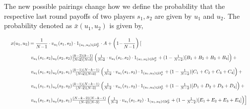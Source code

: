 \documentclass[11pt]{article}
\theoremstyle{plainCl1}
\theoremstyle{plainCl2}
\begin{document}
The new possible pairings change how we define the probability that the
respective last round payoffs of two players \(s_1, s_2\) are given by \(u_1\)
and \(u_2\). The probability denoted as \(\bar{x}(u_1,u_2)\) is given by,

\begin{equation}
  \resizebox{.99\textwidth}{!}
  {%
$
  \setlength{\arraycolsep}{1pt}
  \begin{array}{llrl}
  x(u_1,u_2)	& = \displaystyle \frac{1}{N\!-\!1}\cdot v_{u_1}(s_1,s_2)\cdot 1_{(u_1,u_2)\in \mathcal{U}^2_F} \cdot A + \left(1\!-\!\frac{1}{N\!-\!1}\right) \left[ \right. \\[0.5cm] 
  & \left. v_{u_1}(s_1,s_2) _{u_2}(s_2,s_2)  \frac{\left(k - 2\right) \left(k - 1\right)}{(N\!-\!2)(N\!-\!3)}
  \left(\frac{1}{N\!-\!2}\cdot v_{u_1}(s_1,s_2)\cdot 1_{(u_1,u_2)\in \mathcal{U}^2_F} + (1 - \frac{1}{N - 2}) [B_1 + B_2 + B_3 + B_4]\right) + \right. \\[0.5cm] 
  & \left. v_{u_1}(s_1,s_2) _{u_2}(s_2,s_1)  \frac{\left(k - 1\right) \left(N - k - 1\right)}{(N\!-\!2)(N\!-\!3)} \left(\frac{1}{N\!-\!2}\cdot v_{u_1}(s_1,s_2)\cdot 1_{(u_1,u_2)\in \mathcal{U}^2_F} + (1 - \frac{1}{N - 2}) [C_1 + C_2 + C_3 + C_4]\right) + \right. \\[0.5cm] 
  & \left. v_{u_1}(s_1,s_1) _{u_2}(s_2,s_2)  \frac{\left(k - 1\right) \left(N - k - 1\right)}{(N\!-\!2)(N\!-\!3)} \left(\frac{1}{N\!-\!2}\cdot v_{u_1}(s_1,s_2)\cdot 1_{(u_1,u_2)\in \mathcal{U}^2_F} + (1 - \frac{1}{N - 2}) [D_1 + D_2 + D_3 + D_4]\right) + \right. \\[0.5cm] 
  & \left. v_{u_1}(s_1,s_1) _{u_2}(s_2,s_1)  \frac{\left(N - k - 2\right) \left(N - k - 1\right)}{(N\!-\!2)(N\!-\!3)} \left(\frac{1}{N\!-\!2}\cdot v_{u_1}(s_1,s_2)\cdot 1_{(u_1,u_2)\in \mathcal{U}^2_F} + (1 - \frac{1}{N - 2}) [E_1 + E_2 + E_3 + E_4]\right) \right]
  \end{array} $}
\end{equation}
\end{document}
